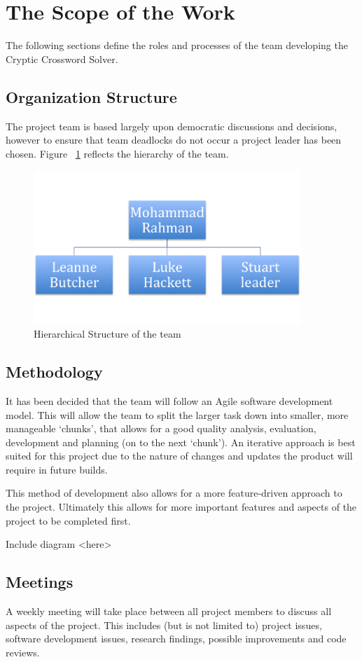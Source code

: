 \newpage
\section{The Scope of the Work}

The following sections define the roles and processes of the team developing the Cryptic Crossword Solver. 

\subsection{Organization Structure}

The project team is based largely upon democratic discussions and decisions, however to ensure that team deadlocks do not occur a project leader has been chosen. Figure ~\ref{fig:org_hierachy} reflects the hierarchy of the team.


\begin{figure}[here]
\includegraphics[width=0.9\textwidth]{requirements/functional_requirements/org_hierachy.png}
\caption{Hierarchical Structure of the team}
\label{fig:org_hierachy}
\end{figure}


\subsection{Methodology}

It has been decided that the team will follow an Agile software development model. This will allow the team to split the larger task down into smaller, more manageable ‘chunks’, that allows for a good quality analysis, evaluation, development and planning (on to the next ‘chunk’). An iterative approach is best suited for this project due to the nature of changes and updates the product will require in future builds.

This method of development also allows for a more feature-driven approach to the project. Ultimately this allows for more important features and aspects of the project to be completed first. 

Include diagram <here>


\subsection{Meetings}

A weekly meeting will take place between all project members to discuss all aspects of the project. This includes (but is not limited to) project issues, software development issues, research findings, possible improvements and code reviews.

